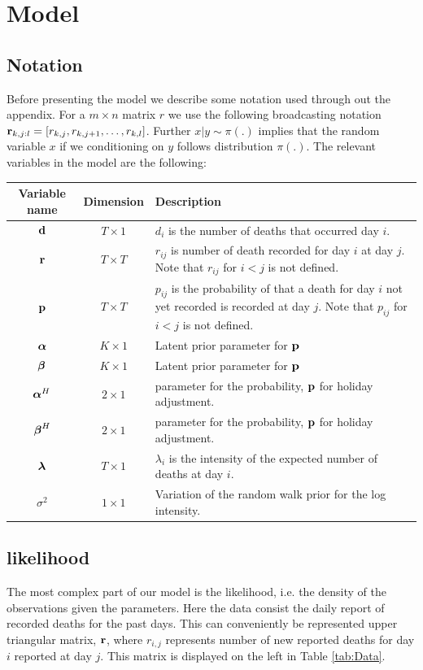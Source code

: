 

\section{Model}

\subsection{Notation}
Before presenting the model we describe some notation used through out the appendix. For a $m \times n$ matrix $r$ we use the following broadcasting notation ${\boldsymbol{\mathrm{r}}}_{k,j:l}=[ r_{k,j}, r_{k,j+1}, \ldots, r_{k,l}]$.
Further $x | y \sim \pi(.)$ implies that the random variable $x$ if we conditioning on $y$ follows distribution $\pi(.)$.
The relevant variables in the model are the following:

	\begin{tabularx}{\linewidth}{ccL}
		Variable name & Dimension & Description \\  \hline
		${\boldsymbol{\mathrm{d}}}$ & $T \times 1$ & $d_i$ is the number of deaths that occurred day $i$. \\
		${\boldsymbol{\mathrm{r}}}$ & $T \times T$ & $r_{ij}$ is number of death recorded for day $i$ at day $j$.  Note that $r_{ij}$ for $i<j$ is not defined.   \\
		${\boldsymbol{\mathrm{p}}}$ & $T \times T$ & $p_{ij}$ is the probability of that a death for day $i$ not yet recorded is recorded at day $j$.
		  Note that $p_{ij}$ for $i<j$ is not defined.  \\
		${\boldsymbol{\mathrm{\alpha}}}$ & $K \times 1$ & Latent prior parameter for ${\boldsymbol{\mathrm{p}}}$ \\
		${\boldsymbol{\mathrm{\beta}}}$ & $K \times 1$ & Latent prior parameter for ${\boldsymbol{\mathrm{p}}}$ \\
		${\boldsymbol{\mathrm{\alpha}}}^H$ & $2 \times 1$ & parameter for the probability, ${\boldsymbol{\mathrm{p}}}$ for holiday adjustment. \\
		${\boldsymbol{\mathrm{\beta}}}^H$ & $2 \times 1$ & parameter for the probability, ${\boldsymbol{\mathrm{p}}}$ for holiday adjustment. \\
		${\boldsymbol{\mathrm{\lambda}}}$ &  $T \times 1$ &  $\lambda_i$  is the intensity of the expected number of deaths at day $i$. \\
		$\sigma^2$ & $1\times 1$ & Variation of the random walk prior for the log intensity.

	\end{tabularx}
\subsection{likelihood}
The most complex part of our model is the likelihood, i.e. the density of the observations given the parameters. Here the data consist the daily report of recorded deaths for the past days. This can conveniently be represented upper triangular matrix, ${\boldsymbol{\mathrm{r}}}$, where $r_{i,j}$ represents number of new reported deaths for day $i$ reported at day $j$. This matrix is displayed on the left in Table \ref{tab:Data}.

